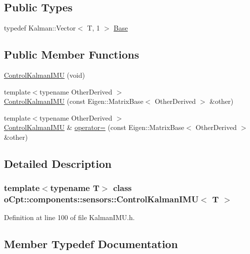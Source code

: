 \subsection*{Public Types}
\begin{DoxyCompactItemize}
\item 
typedef Kalman\+::\+Vector$<$ T, 1 $>$ \hyperlink{classo_cpt_1_1components_1_1sensors_1_1_control_kalman_i_m_u_a86f04b59796a0780208ff528543bf390}{Base}
\end{DoxyCompactItemize}
\subsection*{Public Member Functions}
\begin{DoxyCompactItemize}
\item 
\hyperlink{classo_cpt_1_1components_1_1sensors_1_1_control_kalman_i_m_u_a7e4619f52b9572448ad5184b6e796ee9}{Control\+Kalman\+I\+MU} (void)
\item 
{\footnotesize template$<$typename Other\+Derived $>$ }\\\hyperlink{classo_cpt_1_1components_1_1sensors_1_1_control_kalman_i_m_u_a49168d8285a50e490574a582811fabf8}{Control\+Kalman\+I\+MU} (const Eigen\+::\+Matrix\+Base$<$ Other\+Derived $>$ \&other)
\item 
{\footnotesize template$<$typename Other\+Derived $>$ }\\\hyperlink{classo_cpt_1_1components_1_1sensors_1_1_control_kalman_i_m_u}{Control\+Kalman\+I\+MU} \& \hyperlink{classo_cpt_1_1components_1_1sensors_1_1_control_kalman_i_m_u_a56e78cc546a77e97ff1e1a1605d8cf30}{operator=} (const Eigen\+::\+Matrix\+Base$<$ Other\+Derived $>$ \&other)
\end{DoxyCompactItemize}


\subsection{Detailed Description}
\subsubsection*{template$<$typename T$>$\newline
class o\+Cpt\+::components\+::sensors\+::\+Control\+Kalman\+I\+M\+U$<$ T $>$}



Definition at line 100 of file Kalman\+I\+M\+U.\+h.



\subsection{Member Typedef Documentation}
\hypertarget{classo_cpt_1_1components_1_1sensors_1_1_control_kalman_i_m_u_a86f04b59796a0780208ff528543bf390}{}\label{classo_cpt_1_1components_1_1sensors_1_1_control_kalman_i_m_u_a86f04b59796a0780208ff528543bf390} 
